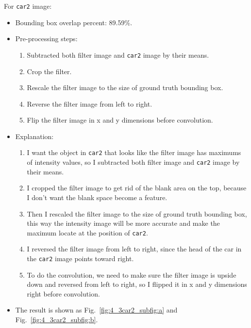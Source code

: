 \documentclass{assignment}
\begin{document}
\begin{problemlist}
For \texttt{car2} image:
\begin{itemize}
    \item Bounding box overlap percent: 89.59\%.
    \item Pre-processing steps: 
    \begin{enumerate}[label={\alph*)}]
        \item Subtracted both filter image and \texttt{car2} image by their means.
        \item Crop the filter.
        \item Rescale the filter image to the size of ground truth bounding box.
        \item Reverse the filter image from left to right.
        \item Flip the filter image in x and y dimensions before convolution.
    \end{enumerate}
    \item Explanation: 
    \begin{enumerate}[label={\alph*)}]
        \item I want the object in \texttt{car2} that looks like the filter image has maximums of intensity values, so I subtracted both filter image and \texttt{car2} image by their means.
        \item I cropped the filter image to get rid of the blank area on the top, because I don't want the blank space become a feature.
        \item Then I rescaled the filter image to the size of ground truth bounding box, this way the intensity image will be more accurate and make the maximum locate at the position of \texttt{car2}.
        \item I reversed the filter image from left to right, since the head of the car in the \texttt{car2} image points toward right.
        \item To do the convolution, we need to make sure the filter image is upside down and reversed from left to right, so I flipped it in x and y dimensions right before convolution.
    \end{enumerate}
    \item The result is shown as Fig.~\ref{fig:4_3car2_subfig:a} and Fig.~\ref{fig:4_3car2_subfig:b}.
\end{itemize}


\end{problemlist}
\end{document}
